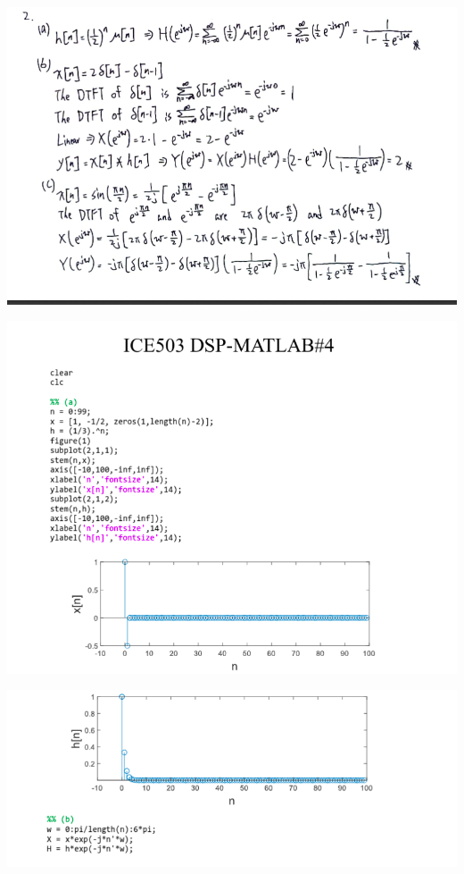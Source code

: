 \documentclass[a4paper]{article}
\begin{document}
	\begin{center}
		\includegraphics[width=1\linewidth]{screenshot033}
	\end{center}
	
	\begin{center}
		\includegraphics[width=1\linewidth]{screenshot034}
	\end{center}
	
	\begin{center}
		\includegraphics[width=1\linewidth]{screenshot035}
	\end{center}
	
\end{document}
